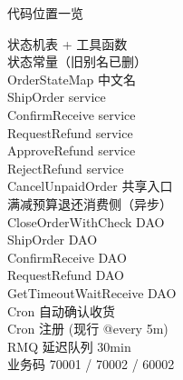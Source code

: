 \documentclass[aspectratio=169,11pt]{beamer}
\begin{document}
\begin{frame}[shrink]{代码位置一览}
\begin{description}
  \item[状态机表 + 工具函数]
  \item[状态常量（旧别名已删）]
  \item[OrderStateMap 中文名]
  \item[ShipOrder service]
  \item[ConfirmReceive service]
  \item[RequestRefund service]
  \item[ApproveRefund service]
  \item[RejectRefund service]
  \item[CancelUnpaidOrder 共享入口]
  \item[满减预算退还消费侧（异步）]
  \item[CloseOrderWithCheck DAO]
  \item[ShipOrder DAO]
  \item[ConfirmReceive DAO]
  \item[RequestRefund DAO]
  \item[GetTimeoutWaitReceive DAO]
  \item[Cron 自动确认收货]
  \item[Cron 注册 (现行 @every 5m)]
  \item[RMQ 延迟队列 30min]
  \item[业务码 70001 / 70002 / 60002]
\end{description}
\end{frame}
\end{document}
